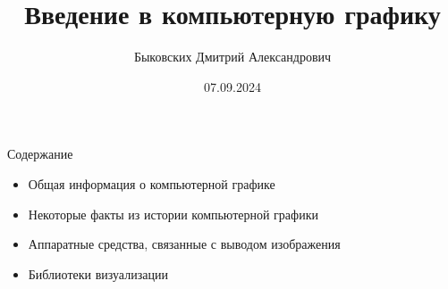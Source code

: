 \documentclass{beamer}
\title[Введение в КГ]{Введение в компьютерную графику}
\author[Быковских Д.А.]{Быковских Дмитрий Александрович}
\date{07.09.2024}
\begin{document}
	\begin{frame}
		\titlepage
	\end{frame}
	\begin{frame}{Содержание}
		\begin{itemize}
			\item 
			Общая информация о компьютерной графике
			\item
			Некоторые факты из истории компьютерной графики
			\item
			Аппаратные средства, связанные с выводом изображения
			\item 
			Библиотеки визуализации
		\end{itemize}
	\end{frame}
\end{document}
